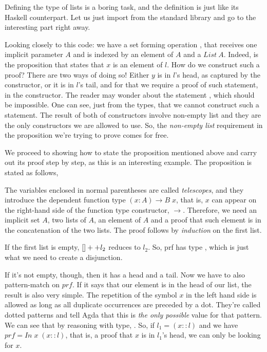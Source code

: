 Defining the type of lists is a boring task, and the definition is just like
its Haskell counterpart. Let us just import from the standard library and go to the
interesting part right away.


Looking closely to this code: we have a set forming operation , that receives
one implicit parameter $A$ and is indexed by an element of $A$ and a $List\ A$. Indeed, 
is the proposition that states that $x$ is an element of $l$. How do we construct such a proof?
There are two ways of doing so! Either $y$ is in $l$'s head, as captured by the 
constructor, or it is in $l$'s tail, and for that we require a proof of such statement, in the 
constructor. The reader may wonder about the statement , which should be impossible. One can see,
just from the types, that we cannot construct such a statement. The result of both of  constructors
involve non-empty list and they are the only constructors we are allowed to use. So, the \emph{non-empty list}
requirement in the proposition we're trying to prove comes for free.

We proceed to showing how to state the proposition mentioned above and carry out its proof step by step, as this is an interesting example.
The proposition is stated as follows,


The variables enclosed in normal parentheses are called \emph{telescopes}, and they introduce
the dependent function type $(x : A) \rightarrow B\;x$, that is, $x$ can appear on the right-hand side of
the function type constructor, $\rightarrow$. Therefore, we need an implicit set $A$, two lists of $A$,
an element of $A$ and a proof that such element is in the concatenation of the two lists.
The proof follows by \emph{induction} on the first list. 


If the first list is empty, $[] ++ l_2$ reduces to $l_2$. So, prf has type , which
is just what we need to create a disjunction.


If it's not empty, though, then it has a head and a tail. Now we have to also pattern-match
on $prf$. If it says that our element is in the head of our list, the result is also very simple.
The repetition of the symbol $x$ in the left hand side is allowed as long as all duplicate occurrences
are preceded by a dot. They're called dotted patterns and tell Agda that this is \emph{the only possible}
value for that pattern. We can see that by reasoning with  type, . 
So, if $l_1 = (x :: l)$ and we have $prf = In\; x\; (x :: l)$, that is, a proof that $x$ is in $l_1$'s head,
we can only be looking for $x$. 

